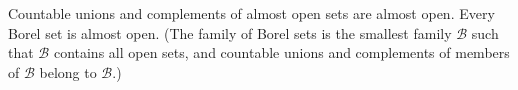 Countable unions and complements of almost open sets are almost open. Every Borel set is almost open.
(The family of Borel sets is the smallest family $\mathcal{B}$ such that $\mathcal{B}$ contains all open sets, and countable unions and complements of members of $\mathcal{B}$ belong to $\mathcal{B}$.)
